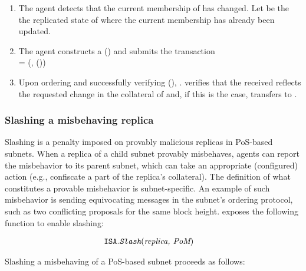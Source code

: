 \begin{enumerate}
    \item The \ipc agent detects that the current membership of  has changed.
    Let  be the the replicated state of  where the current membership has already been updated.

    \item The \ipc agent constructs a {\pof}() and submits the transaction\\
     = (, {\pof}())

    \item Upon ordering  and successfully verifying {\pof}(),
    . verifies that the received  reflects the requested change in the collateral of 
    and, if this is the case, transfers  to .
    
\end{enumerate}

\subsubsection{Slashing a misbehaving replica}
\label{sec:slash}
Slashing is a penalty imposed on provably malicious replicas in PoS-based subnets.
When a replica of a child subnet provably misbehaves, \ipc agents can report the misbehavior to its parent subnet,
which can take an appropriate (configured) action (e.g., confiscate a part of the replica's collateral).
The definition of what constitutes a provable misbehavior is subnet-specific.
An example of such misbehavior is sending equivocating messages in the subnet's ordering protocol, such as two conflicting proposals for the same block height.
\ipc exposes the following function to enable slashing:

\begin{align*}
    \texttt{ISA}.&\textit{\texttt{Slash}}(\textit{replica, PoM})
\end{align*}

Slashing a misbehaving  of a PoS-based subnet  proceeds as follows:


